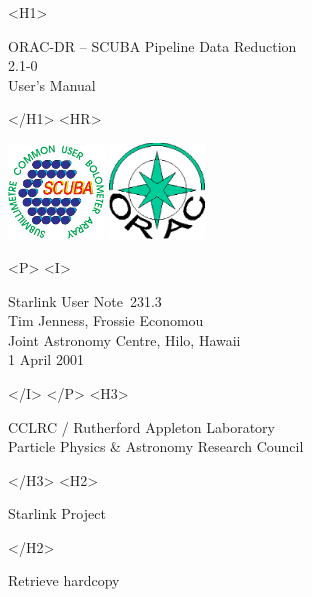 \documentclass[twoside,11pt]{article}
\newcommand{\stardoccategory}  {Starlink User Note}
\newcommand{\stardocsource}    {sun\stardocnumber}
\newcommand{\stardocnumber}    {231.3}
\newcommand{\stardocauthors}   {Tim Jenness, Frossie Economou\\
Joint Astronomy Centre, Hilo, Hawaii}
\newcommand{\stardocdate}      {1 April 2001}
\newcommand{\stardoctitle}     {ORAC-DR -- SCUBA Pipeline Data Reduction}
\newcommand{\stardocversion}   {2.1-0}
\newcommand{\stardocmanual}    {User's Manual}
\newcommand{\htmladdnormallink}[2]{#1}
\newcommand{\htmladdimg}[1]{}
\newcommand{\xlabel}[1]{}
\renewcommand{\_}{\texttt{\symbol{95}}}
\begin{document}
\begin{htmlonly}
   \xlabel{}
   \begin{rawhtml} <H1> \end{rawhtml}
      \stardoctitle\\
      \stardocversion\\
      \stardocmanual
   \begin{rawhtml} </H1> <HR> \end{rawhtml}

\includegraphics[width=1.0in]{sun231_sculogo.eps}
\includegraphics[width=1.0in]{sun231_logo.eps}

   \begin{rawhtml} <P> <I> \end{rawhtml}
   \stardoccategory\ \stardocnumber \\
   \stardocauthors \\
   \stardocdate
   \begin{rawhtml} </I> </P> <H3> \end{rawhtml}
      \htmladdnormallink{CCLRC / Rutherford Appleton Laboratory}
                        {http://www.cclrc.ac.uk} \\
      \htmladdnormallink{Particle Physics \& Astronomy Research Council}
                        {http://www.pparc.ac.uk} \\
   \begin{rawhtml} </H3> <H2> \end{rawhtml}
      \htmladdnormallink{Starlink Project}{http://www.starlink.rl.ac.uk/}
   \begin{rawhtml} </H2> \end{rawhtml}
   \htmladdnormallink{\htmladdimg{source.gif} Retrieve hardcopy}
      {http://www.starlink.rl.ac.uk/cgi-bin/hcserver?\stardocsource}\\


\end{htmlonly}
\end{document}
